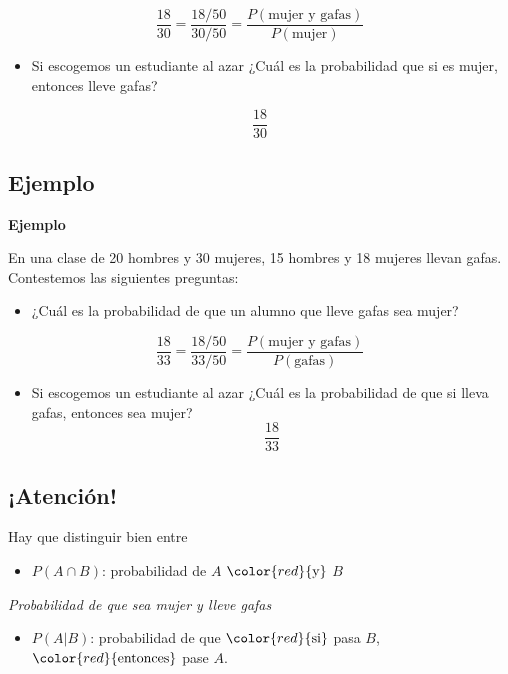 \documentclass[]{book}
\providecommand{\tightlist}{%
  \setlength{\itemsep}{0pt}\setlength{\parskip}{0pt}}
\begin{document}
\[
\frac{18}{30}=\frac{18/50}{30/50}=\frac{P(\mbox{mujer  y gafas})}{P(\mbox{mujer})}
\]

\begin{itemize}
\tightlist
\item
  Si escogemos un estudiante al azar ¿Cuál es la probabilidad que si es mujer, entonces lleve gafas?
\end{itemize}

\[
\frac{18}{30}
\]

\hypertarget{ejemplo}{%
\subsection{Ejemplo}\label{ejemplo}}

\textbf{Ejemplo}

En una clase de 20 hombres y 30 mujeres, 15 hombres y 18 mujeres llevan gafas. Contestemos las siguientes preguntas:

\begin{itemize}
\tightlist
\item
  ¿Cuál es la probabilidad de que un alumno que lleve gafas sea mujer?
\end{itemize}

\[
\frac{18}{33}=\frac{18/50}{33/50}=\frac{P(\mbox{mujer y gafas})}{P(\mbox{gafas})}
\]

\begin{itemize}
\tightlist
\item
  Si escogemos un estudiante al azar ¿Cuál es la probabilidad de que si lleva gafas, entonces sea mujer?
  \[
  \frac{18}{33}
  \]
\end{itemize}

\hypertarget{atenciuxf3n}{%
\subsection{¡Atención!}\label{atenciuxf3n}}

Hay que distinguir bien entre

\begin{itemize}
\tightlist
\item
  \(P(A\cap B)\): probabilidad de \(A\) \(\color{red}{\text{y}}\) \(B\)
\end{itemize}

\emph{Probabilidad de que sea mujer y lleve gafas}

\begin{itemize}
\tightlist
\item
  \(P(A|B)\): probabilidad de que \(\color{red}{\text{si}}\) pasa \(B\), \(\color{red}{\text{entonces}}\) pase \(A\).
\end{itemize}
\end{document}
